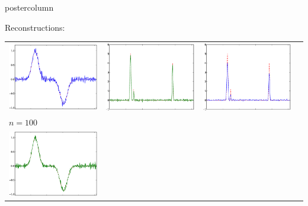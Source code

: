 \documentclass[final]{beamer}
\begin{document}
\begin{frame}
\begin{columns}
\begin{column}{.32\textwidth}
\begin{beamercolorbox}[center,wd=\textwidth]{postercolumn}
\begin{minipage}[T]{.95\textwidth}
{\begin{block}{Reconstructions:}
\begin{table}
\begin{tabular}{cccc}
                  \includegraphics[width=3.4in,trim=0 30 0 0,clip]{./figures/GCVsmooth100.eps} &
                  \includegraphics[width=3.4in,trim=0 30 0 0,clip]{./figures/minepeaked100.eps} &
                  \includegraphics[width=3.4in,trim=0 30 0 0,clip]{./figures/GCVpeaked15.eps} \\
                  \multicolumn{4}{l}{$n = 100$}  \\
                  \includegraphics[width=3.4in,trim=0 30 0 0,clip]{./figures/minesmooth300.eps} &

\end{tabular}
\end{table}
\end{block}}
\end{minipage}
\end{beamercolorbox}
\end{column}
\end{columns}
\end{frame}
\end{document}
